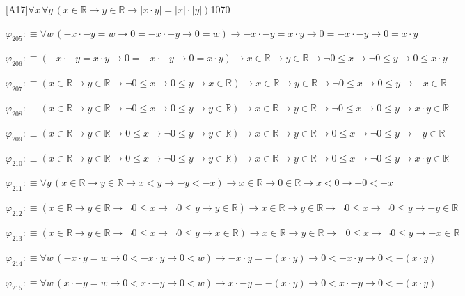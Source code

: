 \begin{fullproof}{[A17]}{$\forall x\,\forall y\,(x \in \mathbb{R} \to y \in \mathbb{R} \to \lvert x \cdot y \rvert = \lvert x \rvert \cdot \lvert y \rvert)$}{1070}
\begin{abbrevlist}
\item $\varphi_{205} :\equiv \forall w\,(-x \cdot -y = w \to 0 = -x \cdot -y \to 0 = w) \to -x \cdot -y = x \cdot y \to 0 = -x \cdot -y \to 0 = x \cdot y$
\item $\varphi_{206} :\equiv (-x \cdot -y = x \cdot y \to 0 = -x \cdot -y \to 0 = x \cdot y) \to x \in \mathbb{R} \to y \in \mathbb{R} \to \neg 0 \leq x \to \neg 0 \leq y \to 0 \leq x \cdot y$
\item $\varphi_{207} :\equiv (x \in \mathbb{R} \to y \in \mathbb{R} \to \neg 0 \leq x \to 0 \leq y \to x \in \mathbb{R}) \to x \in \mathbb{R} \to y \in \mathbb{R} \to \neg 0 \leq x \to 0 \leq y \to -x \in \mathbb{R}$
\item $\varphi_{208} :\equiv (x \in \mathbb{R} \to y \in \mathbb{R} \to \neg 0 \leq x \to 0 \leq y \to y \in \mathbb{R}) \to x \in \mathbb{R} \to y \in \mathbb{R} \to \neg 0 \leq x \to 0 \leq y \to x \cdot y \in \mathbb{R}$
\item $\varphi_{209} :\equiv (x \in \mathbb{R} \to y \in \mathbb{R} \to 0 \leq x \to \neg 0 \leq y \to y \in \mathbb{R}) \to x \in \mathbb{R} \to y \in \mathbb{R} \to 0 \leq x \to \neg 0 \leq y \to -y \in \mathbb{R}$
\item $\varphi_{210} :\equiv (x \in \mathbb{R} \to y \in \mathbb{R} \to 0 \leq x \to \neg 0 \leq y \to y \in \mathbb{R}) \to x \in \mathbb{R} \to y \in \mathbb{R} \to 0 \leq x \to \neg 0 \leq y \to x \cdot y \in \mathbb{R}$
\item $\varphi_{211} :\equiv \forall y\,(x \in \mathbb{R} \to y \in \mathbb{R} \to x < y \to -y < -x) \to x \in \mathbb{R} \to 0 \in \mathbb{R} \to x < 0 \to -0 < -x$
\item $\varphi_{212} :\equiv (x \in \mathbb{R} \to y \in \mathbb{R} \to \neg 0 \leq x \to \neg 0 \leq y \to y \in \mathbb{R}) \to x \in \mathbb{R} \to y \in \mathbb{R} \to \neg 0 \leq x \to \neg 0 \leq y \to -y \in \mathbb{R}$
\item $\varphi_{213} :\equiv (x \in \mathbb{R} \to y \in \mathbb{R} \to \neg 0 \leq x \to \neg 0 \leq y \to x \in \mathbb{R}) \to x \in \mathbb{R} \to y \in \mathbb{R} \to \neg 0 \leq x \to \neg 0 \leq y \to -x \in \mathbb{R}$
\item $\varphi_{214} :\equiv \forall w\,(-x \cdot y = w \to 0 < -x \cdot y \to 0 < w) \to -x \cdot y = -(x \cdot y) \to 0 < -x \cdot y \to 0 < -(x \cdot y)$
\item $\varphi_{215} :\equiv \forall w\,(x \cdot -y = w \to 0 < x \cdot -y \to 0 < w) \to x \cdot -y = -(x \cdot y) \to 0 < x \cdot -y \to 0 < -(x \cdot y)$

\end{abbrevlist}
\end{fullproof}
